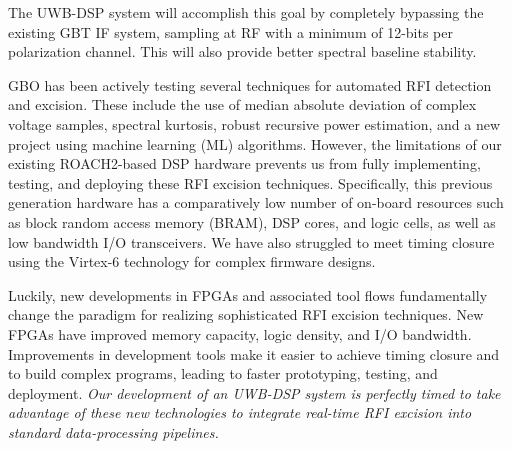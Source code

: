 \documentclass[10pt]{myNSF}
\begin{document}
The UWB-DSP system will accomplish this goal by completely bypassing
the existing GBT IF system, sampling at RF with a minimum of 12-bits
per polarization channel.  This will also provide better spectral
baseline stability.

 GBO has been actively testing several
techniques for automated RFI detection and excision.  These include
the use of median absolute deviation of complex voltage samples,
spectral kurtosis, robust recursive power estimation, and a new
project using machine learning (ML) algorithms.  However, the
limitations of our existing ROACH2-based DSP hardware prevents us from
fully implementing, testing, and deploying these RFI excision
techniques.  Specifically, this previous generation hardware has a
comparatively low number of on-board resources such as block random
access memory (BRAM), DSP cores, and logic cells, as well as low
bandwidth I/O transceivers.  We have also struggled to meet timing
closure using the Virtex-6 technology for complex firmware designs.

Luckily, new developments in FPGAs and associated tool flows
fundamentally change the paradigm for realizing sophisticated RFI
excision techniques.  New FPGAs have improved memory capacity, logic
density, and I/O bandwidth.  Improvements in development tools make it
easier to achieve timing closure and to build complex programs,
leading to faster prototyping, testing, and deployment.  \emph{Our
  development of an UWB-DSP system is perfectly timed to take
  advantage of these new technologies to integrate real-time RFI
  excision into standard data-processing pipelines.}
\end{document}

